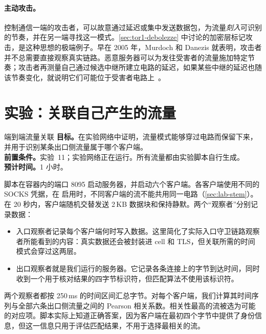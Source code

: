 \paragraph{主动攻击。}控制通信一端的攻击者，可以故意通过延迟或集中发送数据包，为流量\emph{刻入}可识别的节奏，并在另一端寻找这一模式。\cref{sec:tor1-debolezze} 中讨论的加密层标记攻击，是这种思想的极端例子。早在 2005 年，Murdoch 和 Danezis 就表明，攻击者并不总需要直接观察真实链路。恶意服务器可以为发往受害者的流量施加特定节奏；攻击者再测量自己通过候选中继所建立电路的延迟，如果某些中继的延迟也随该节奏变化，就说明它们可能位于受害者电路上~\cite{murdoch2005lowcost}。

\section{实验：关联自己产生的流量}\label{sec:lab-attacchi}

\begin{laboratorio}[16]{端到端流量关联}
\textbf{目标。}在实验网络中证明，流量模式能够穿过电路而保留下来，并用于识别某条出口侧流量属于哪个客户端。\\
\textbf{前置条件。}实验~11；实验网络正在运行。所有流量都由实验脚本自行生成。\\
\textbf{预计时间。}1 小时。
\end{laboratorio}

 脚本在容器内的端口 8095 启动服务器，并启动六个客户端。各客户端使用不同的 SOCKS 凭据，在  启用时，不同客户端的流不能共用同一电路（\cref{sec:lab-stem}）。在 20 秒内，客户端随机交替发送 2\,KB 数据块和保持静默。两个\enquote{观察者}分别记录数据：
\begin{itemize}
  \item 入口观察者记录每个客户端何时写入数据。这里简化了实际入口守卫链路观察者所能看到的内容：真实数据还会被封装进 cell 和 TLS，但关联所需的时间模式会穿过这两层。
  \item 出口观察者就是我们运行的服务器。它记录各条连接上的字节到达时间，同时收到一个用于核对结果的四字节标识符，但匹配算法不使用该标识符。
\end{itemize}
两个观察者都按 250\,ms 的时间区间汇总字节。对每个客户端，我们计算其时间序列与全部六条出口侧流量之间的 Pearson 相关系数。相关性最高的流被选为可能的对应项。脚本实际上知道正确答案，因为客户端在最初四个字节中提供了身份信息，但这一信息只用于评估匹配结果，不用于选择最相关的流。

